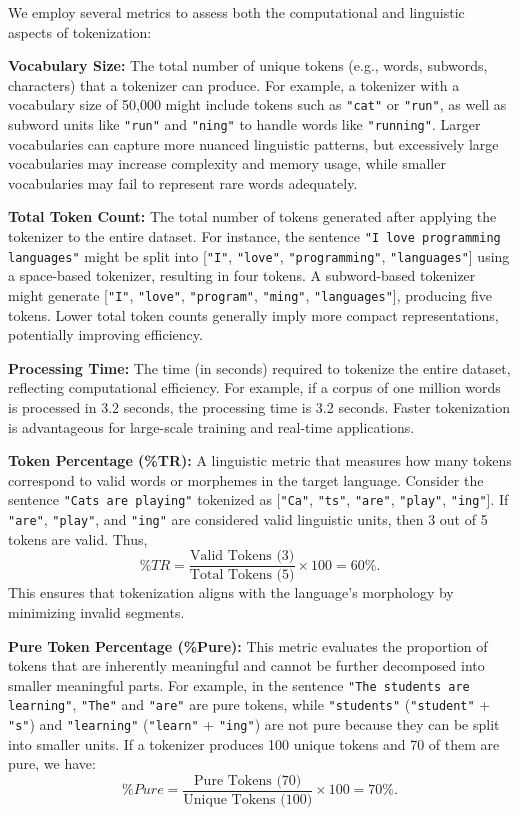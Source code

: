 \documentclass{article}
\begin{document}
  We employ several metrics to assess both the computational and linguistic aspects of tokenization:
  
  \textbf{Vocabulary Size:}  
  The total number of unique tokens (e.g., words, subwords, characters) that a tokenizer can produce. For example, a tokenizer with a vocabulary size of 50,000 might include tokens such as \texttt{"cat"} or \texttt{"run"}, as well as subword units like \texttt{"run"} and \texttt{"ning"} to handle words like \texttt{"running"}. Larger vocabularies can capture more nuanced linguistic patterns, but excessively large vocabularies may increase complexity and memory usage, while smaller vocabularies may fail to represent rare words adequately.
  
  \textbf{Total Token Count:}  
  The total number of tokens generated after applying the tokenizer to the entire dataset. For instance, the sentence \texttt{"I love programming languages"} might be split into [\texttt{"I"}, \texttt{"love"}, \texttt{"programming"}, \texttt{"languages"}] using a space-based tokenizer, resulting in four tokens. A subword-based tokenizer might generate [\texttt{"I"}, \texttt{"love"}, \texttt{"program"}, \texttt{"ming"}, \texttt{"languages"}], producing five tokens. Lower total token counts generally imply more compact representations, potentially improving efficiency.
  
  \textbf{Processing Time:}  
  The time (in seconds) required to tokenize the entire dataset, reflecting computational efficiency. For example, if a corpus of one million words is processed in 3.2 seconds, the processing time is 3.2 seconds. Faster tokenization is advantageous for large-scale training and real-time applications.
  
  \textbf{Token Percentage (\%TR):}  
  A linguistic metric that measures how many tokens correspond to valid words or morphemes in the target language. Consider the sentence \texttt{"Cats are playing"} tokenized as [\texttt{"Ca"}, \texttt{"ts"}, \texttt{"are"}, \texttt{"play"}, \texttt{"ing"}]. If \texttt{"are"}, \texttt{"play"}, and \texttt{"ing"} are considered valid linguistic units, then 3 out of 5 tokens are valid. Thus,  
  \[
  \%TR = \frac{\text{Valid Tokens (3)}}{\text{Total Tokens (5)}} \times 100 = 60\%.
  \]
  This ensures that tokenization aligns with the language’s morphology by minimizing invalid segments.
  
  \textbf{Pure Token Percentage (\%Pure):}  
  This metric evaluates the proportion of tokens that are inherently meaningful and cannot be further decomposed into smaller meaningful parts. For example, in the sentence \texttt{"The students are learning"}, \texttt{"The"} and \texttt{"are"} are pure tokens, while \texttt{"students"} (\texttt{"student"} + \texttt{"s"}) and \texttt{"learning"} (\texttt{"learn"} + \texttt{"ing"}) are not pure because they can be split into smaller units. If a tokenizer produces 100 unique tokens and 70 of them are pure, we have:  
  \[
  \%Pure = \frac{\text{Pure Tokens (70)}}{\text{Unique Tokens (100)}} \times 100 = 70\%.
  \]
  
\end{document}
